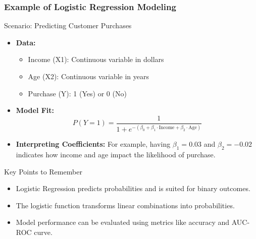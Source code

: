 \documentclass[aspectratio=169]{beamer}
\begin{document}
\begin{frame}[fragile]
    \frametitle{Example of Logistic Regression Modeling}
    \begin{block}{Scenario: Predicting Customer Purchases}
        \begin{itemize}
            \item \textbf{Data:} 
            \begin{itemize}
                \item Income (X1): Continuous variable in dollars
                \item Age (X2): Continuous variable in years
                \item Purchase (Y): 1 (Yes) or 0 (No)
            \end{itemize}
            \item \textbf{Model Fit:}
            \[
            P(Y=1) = \frac{1}{1 + e^{-(\beta_0 + \beta_1 \cdot \text{Income} + \beta_2 \cdot \text{Age})}}
            \]
            \item \textbf{Interpreting Coefficients:} For example, having \(\beta_1=0.03\) and \(\beta_2=-0.02\) indicates how income and age impact the likelihood of purchase.
        \end{itemize}
    \end{block}
    
    \begin{block}{Key Points to Remember}
        \begin{itemize}
            \item Logistic Regression predicts probabilities and is suited for binary outcomes.
            \item The logistic function transforms linear combinations into probabilities.
            \item Model performance can be evaluated using metrics like accuracy and AUC-ROC curve.
        \end{itemize}
    \end{block}
\end{frame}
\end{document}
